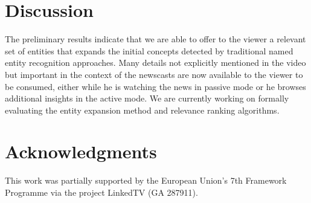 \documentclass{llncs}
\begin{document}
\section{Discussion}
\label{sec:discussion}
The preliminary results indicate that we are able to offer to the viewer a relevant set of entities that expands the initial concepts detected by traditional named entity recognition approaches. Many details not explicitly mentioned in the video but important in the context of the newscasts are now available to the viewer to be consumed, either while he is watching the news in passive mode or he browses additional insights in the active mode. We are currently working on formally evaluating the entity expansion method and relevance ranking algorithms.




\section*{Acknowledgments}
This work was partially supported by the European Union's 7th Framework Programme via the project LinkedTV (GA 287911).



\end{document}
